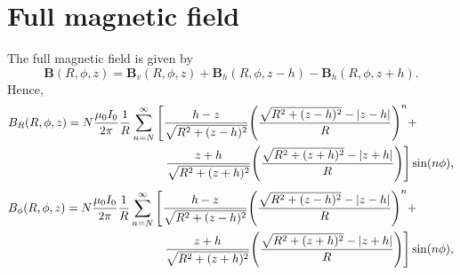 \documentclass{article}
\let\vec\mathbf
\begin{document}
\section{Full magnetic field}

The full magnetic field is given by
\[\mathbf{B}(R,\phi,z) = \vec{B}_{v}(R, \phi, z) + \vec{B}_h(R, \phi, z-h) - \vec{B}_h(R, \phi, z+h).\]
Hence,
\[\begin{aligned}
B_R(R,\phi,z) = N\frac{\mu_0 I_0}{2 \pi}\frac{1}{R}\sum_{n=N}^{\infty}&\left[\frac{h-z}{\sqrt{R^2+(z-h)^2}}\qty(\frac{\sqrt{R^2+(z-h)^2}-\abs{z-h}}{R})^n+\right. \\
&\ \ \left.\frac{z+h}{\sqrt{R^2+(z+h)^2}}\qty(\frac{\sqrt{R^2+(z+h)^2}-\abs{z+h}}{R})\right]\sin(n\phi),
\end{aligned}\]
\[\begin{aligned}
B_\phi(R,\phi,z) = N\frac{\mu_0 I_0}{2 \pi}\frac{1}{R}\sum_{n=N}^{\infty}&\left[\frac{h-z}{\sqrt{R^2+(z-h)^2}}\qty(\frac{\sqrt{R^2+(z-h)^2}-\abs{z-h}}{R})^n+\right. \\
&\ \ \left.\frac{z+h}{\sqrt{R^2+(z+h)^2}}\qty(\frac{\sqrt{R^2+(z+h)^2}-\abs{z+h}}{R})\right]\sin(n\phi),
\end{aligned}\]
\end{document}
